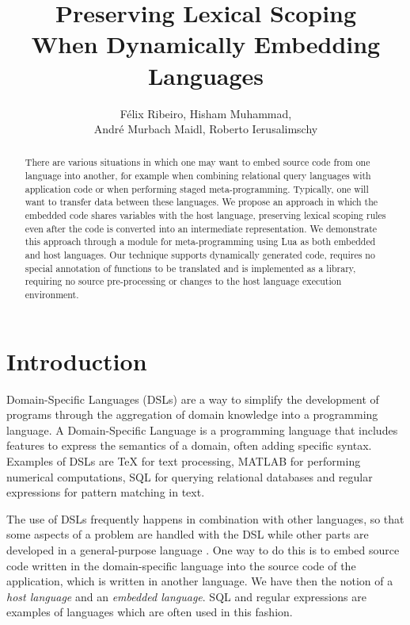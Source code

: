 \documentclass[english]{llncs}
\title{Preserving Lexical Scoping\\
When Dynamically Embedding Languages}
\author{
Félix Ribeiro,
Hisham Muhammad,\\
André Murbach Maidl,
Roberto Ierusalimschy
}
\institute{
Department of Computer Science --
PUC-Rio -- Rio de Janeiro -- Brazil
\email{\{fribeiro,hisham,amaidl,roberto\}@inf.puc-rio.br}
}
\begin{document}
\maketitle

\begin{abstract}

There are various situations in which one may want to embed source code from
one language into another, for example when combining relational query
languages with application code or when performing staged meta-programming.
Typically, one will want to transfer data between these languages.
We propose an approach in which the embedded code shares variables with the
host language, preserving lexical scoping rules even after the code is
converted into an intermediate representation. We demonstrate this approach
through a module for meta-programming using Lua as both embedded and host
languages. Our technique supports dynamically generated code,
requires no special annotation of functions to be translated and is
implemented as a library, requiring no source pre-processing or changes to
the host language execution environment.

\end{abstract}

\section{Introduction}
\label{sec:introduction}

Domain-Specific Languages (DSLs) are a way to simplify the development
of programs through the aggregation of domain knowledge into a
programming language.
A Domain-Specific Language is a programming language that
includes features to express the semantics of a domain,
often adding specific syntax.
Examples of DSLs are \TeX{} for text processing, MATLAB for performing
numerical computations, SQL for querying relational databases and
regular expressions for pattern matching in text.

The use of DSLs frequently happens in combination with other languages, so
that some aspects of a problem are handled with the DSL while other parts are
developed in a general-purpose language \cite{Fowler:2010:DSL:1809745}. One
way to do this is to embed source code written in the domain-specific language
into the source code of the application, which is written in another language.
We have then the notion of a \emph{host language} and an \emph{embedded language}.
SQL and regular expressions are examples of languages which are often used in this fashion.
\end{document}
